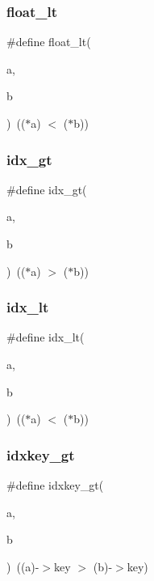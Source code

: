 \mbox{\label{a00140_aa5e1ffbeea4ce3d5c0029c0388e17e42}} 
\subsubsection{\texorpdfstring{float\+\_\+lt}{float\_lt}}
{\footnotesize\ttfamily \#define float\+\_\+lt(\begin{DoxyParamCaption}\item[{}]{a,  }\item[{}]{b }\end{DoxyParamCaption})~(($\ast$a) $<$ ($\ast$b))}

\mbox{\label{a00140_ac084b3e069fd8d98b8f68e2376c33770}} 
\subsubsection{\texorpdfstring{idx\+\_\+gt}{idx\_gt}}
{\footnotesize\ttfamily \#define idx\+\_\+gt(\begin{DoxyParamCaption}\item[{}]{a,  }\item[{}]{b }\end{DoxyParamCaption})~(($\ast$a) $>$ ($\ast$b))}

\mbox{\label{a00140_a978285df780c1e9d547c6f1a6353c50d}} 
\subsubsection{\texorpdfstring{idx\+\_\+lt}{idx\_lt}}
{\footnotesize\ttfamily \#define idx\+\_\+lt(\begin{DoxyParamCaption}\item[{}]{a,  }\item[{}]{b }\end{DoxyParamCaption})~(($\ast$a) $<$ ($\ast$b))}

\mbox{\label{a00140_aae538dbecd44af4bcfb90ec5dcacc842}} 
\subsubsection{\texorpdfstring{idxkey\+\_\+gt}{idxkey\_gt}}
{\footnotesize\ttfamily \#define idxkey\+\_\+gt(\begin{DoxyParamCaption}\item[{}]{a,  }\item[{}]{b }\end{DoxyParamCaption})~((a)-\/$>$key $>$ (b)-\/$>$key)}

